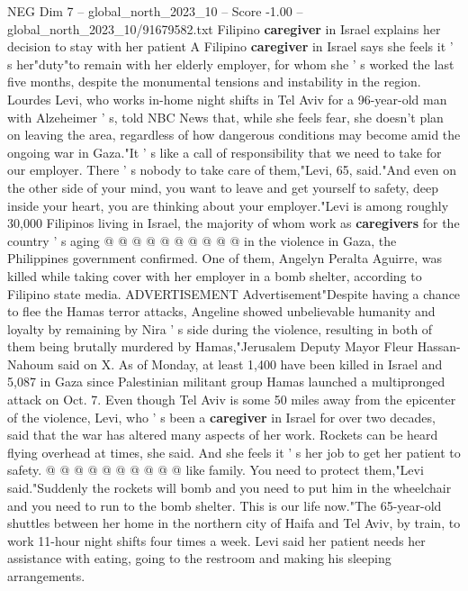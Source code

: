 \begin{textsample}{NEG Dim 7 – global\_north\_2023\_10 – Score -1.00 – global\_north\_2023\_10/91679582.txt}  \label{ex:f7_neg_201}
Filipino \textbf{caregiver} in Israel explains her decision to stay with her patient A Filipino \textbf{caregiver} in Israel says she feels it ' s her"duty"to remain with her elderly employer, for whom she ' s worked the last five months, despite the monumental tensions and instability in the region.
Lourdes Levi, who works in-home night shifts in Tel Aviv for a 96-year-old man with Alzeheimer ' s, told NBC News that, while she feels fear, she doesn't plan on leaving the area, regardless of how dangerous conditions may become amid the ongoing war in Gaza."It ' s like a call of responsibility that we need to take for our employer.
There ' s nobody to take care of them,"Levi, 65, said."And even on the other side of your mind, you want to leave and get yourself to safety, deep inside your heart, you are thinking about your employer."Levi is among roughly 30,000 Filipinos living in Israel, the majority of whom work as \textbf{caregivers} for the country ' s aging @ @ @ @ @ @ @ @ @ @ in the violence in Gaza, the Philippines government confirmed.
One of them, Angelyn Peralta Aguirre, was killed while taking cover with her employer in a bomb shelter, according to Filipino state media.
ADVERTISEMENT Advertisement"Despite having a chance to flee the Hamas terror attacks, Angeline showed unbelievable humanity and loyalty by remaining by Nira ' s side during the violence, resulting in both of them being brutally murdered by Hamas,"Jerusalem Deputy Mayor Fleur Hassan-Nahoum said on X.
As of Monday, at least 1,400 have been killed in Israel and 5,087 in Gaza since Palestinian militant group Hamas launched a multipronged attack on Oct. 7.
Even though Tel Aviv is some 50 miles away from the epicenter of the violence, Levi, who ' s been a \textbf{caregiver} in Israel for over two decades, said that the war has altered many aspects of her work.
Rockets can be heard flying overhead at times, she said.
And she feels it ' s her job to get her patient to safety. @ @ @ @ @ @ @ @ @ @ like family.
You need to protect them,"Levi said."Suddenly the rockets will bomb and you need to put him in the wheelchair and you need to run to the bomb shelter.
This is our life now."The 65-year-old shuttles between her home in the northern city of Haifa and Tel Aviv, by train, to work 11-hour night shifts four times a week.
Levi said her patient needs her assistance with eating, going to the restroom and making his sleeping arrangements.

\end{textsample}
